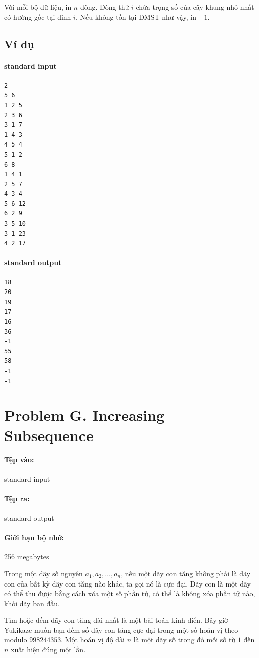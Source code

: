 \documentclass[11pt]{article}
\begin{document}
Với mỗi bộ dữ liệu, in \(n\) dòng. Dòng thứ \(i\) chứa trọng số của cây khung
nhỏ nhất có hướng gốc tại đỉnh \(i\). Nếu không tồn tại DMST như vậy, in
\(-1\).

\subsection*{Ví dụ}

\paragraph{standard input}
\begin{verbatim}
2
5 6
1 2 5
2 3 6
3 1 7
1 4 3
4 5 4
5 1 2
6 8
1 4 1
2 5 7
4 3 4
5 6 12
6 2 9
3 5 10
3 1 23
4 2 17
\end{verbatim}

\paragraph{standard output}
\begin{verbatim}
18
20
19
17
16
36
-1
55
58
-1
-1
\end{verbatim}

\section{Problem G. Increasing Subsequence}

\paragraph{Tệp vào:} standard input
\paragraph{Tệp ra:} standard output
\paragraph{Giới hạn bộ nhớ:} 256 megabytes

Trong một dãy số nguyên \(a_1,a_2,\ldots,a_n\), nếu một dãy con tăng không
phải là dãy con của bất kỳ dãy con tăng nào khác, ta gọi nó là cực đại. Dãy
con là một dãy có thể thu được bằng cách xóa một số phần tử, có thể là không
xóa phần tử nào, khỏi dãy ban đầu.

Tìm hoặc đếm dãy con tăng dài nhất là một bài toán kinh điển. Bây giờ
Yukikaze muốn bạn đếm số dãy con tăng cực đại trong một số hoán vị theo
modulo \(998244353\). Một hoán vị độ dài \(n\) là một dãy số trong đó mỗi số
từ \(1\) đến \(n\) xuất hiện đúng một lần.
\end{document}
